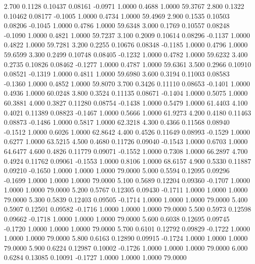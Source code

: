    2.700   0.1128   0.10437   0.08161  -0.0971   1.0000   0.4688   1.0000  59.3767
   2.800   0.1322   0.10462   0.08177  -0.1005   1.0000   0.4734   1.0000  59.4969
   2.900   0.1535   0.10503   0.08206  -0.1045   1.0000   0.4786   1.0000  59.6348
   3.000   0.1769   0.10557   0.08248  -0.1090   1.0000   0.4821   1.0000  59.7237
   3.100   0.2009   0.10614   0.08296  -0.1137   1.0000   0.4822   1.0000  59.7281
   3.200   0.2255   0.10676   0.08348  -0.1185   1.0000   0.4796   1.0000  59.6599
   3.300   0.2499   0.10748   0.08405  -0.1232   1.0000   0.4782   1.0000  59.6232
   3.400   0.2735   0.10826   0.08462  -0.1277   1.0000   0.4787   1.0000  59.6361
   3.500   0.2966   0.10910   0.08521  -0.1319   1.0000   0.4811   1.0000  59.6980
   3.600   0.3194   0.11003   0.08583  -0.1360   1.0000   0.4852   1.0000  59.8070
   3.700   0.3426   0.11110   0.08653  -0.1401   1.0000   0.4936   1.0000  60.0248
   3.800   0.3524   0.11135   0.08671  -0.1404   1.0000   0.5075   1.0000  60.3881
   4.000   0.3827   0.11280   0.08754  -0.1438   1.0000   0.5479   1.0000  61.4403
   4.100   0.4021   0.11389   0.08823  -0.1467   1.0000   0.5666   1.0000  61.9273
   4.200   0.4180   0.11463   0.08873  -0.1486   1.0000   0.5817   1.0000  62.3218
   4.300   0.4366   0.11568   0.08940  -0.1512   1.0000   0.6026   1.0000  62.8642
   4.400   0.4526   0.11649   0.08993  -0.1529   1.0000   0.6277   1.0000  63.5215
   4.500   0.4680   0.11726   0.09040  -0.1543   1.0000   0.6703   1.0000  64.6477
   4.600   0.4826   0.11779   0.09071  -0.1552   1.0000   0.7308   1.0000  66.2897
   4.700   0.4924   0.11762   0.09061  -0.1553   1.0000   0.8106   1.0000  68.6157
   4.900   0.5330   0.11887   0.09210  -0.1650   1.0000   1.0000   1.0000  79.0000
   5.000   0.5594   0.12095   0.09296  -0.1699   1.0000   1.0000   1.0000  79.0000
   5.100   0.5689   0.12204   0.09360  -0.1707   1.0000   1.0000   1.0000  79.0000
   5.200   0.5767   0.12305   0.09430  -0.1711   1.0000   1.0000   1.0000  79.0000
   5.300   0.5839   0.12403   0.09505  -0.1714   1.0000   1.0000   1.0000  79.0000
   5.400   0.5907   0.12501   0.09582  -0.1716   1.0000   1.0000   1.0000  79.0000
   5.500   0.5973   0.12598   0.09662  -0.1718   1.0000   1.0000   1.0000  79.0000
   5.600   0.6038   0.12695   0.09745  -0.1720   1.0000   1.0000   1.0000  79.0000
   5.700   0.6101   0.12792   0.09829  -0.1722   1.0000   1.0000   1.0000  79.0000
   5.800   0.6163   0.12890   0.09915  -0.1724   1.0000   1.0000   1.0000  79.0000
   5.900   0.6224   0.12987   0.10002  -0.1726   1.0000   1.0000   1.0000  79.0000
   6.000   0.6284   0.13085   0.10091  -0.1727   1.0000   1.0000   1.0000  79.0000
